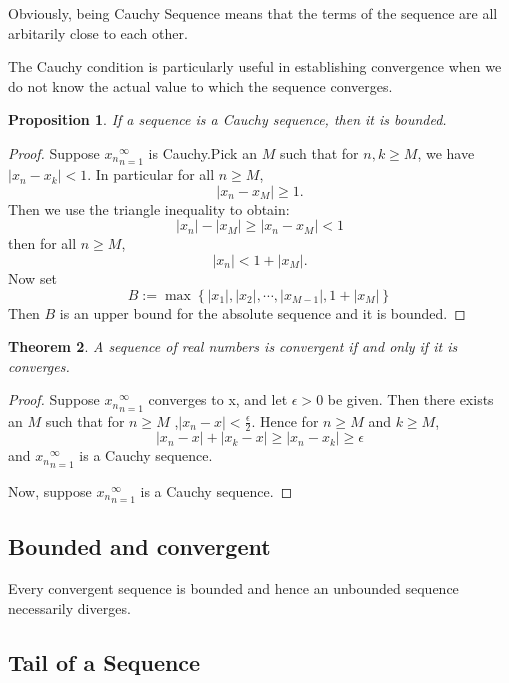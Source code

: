 \documentclass{article}
\newtheorem{theorem}{Theorem}[section]
\newtheorem{prop}[theorem]{Proposition}
\theoremstyle{definition}
\begin{document}
Obviously, being Cauchy Sequence means that the terms 
of the sequence are all arbitarily close to each other.

The Cauchy condition is particularly useful in establishing 
convergence when we do not know the actual value to which 
the sequence converges.

\begin{prop}
If a sequence is a Cauchy sequence, then it is bounded.
\end{prop}

\begin{proof}
    Suppose ${x_{n}}_{n=1}^{\infty}$ is Cauchy.Pick an $M$ 
    such that for $n,k\geq M$, we have $|x_{n}-x_{k}|<1$. In particular 
    for all $n\geq M$, $$|x_{n}-x_{M}|\geq 1.$$
    Then we use the triangle inequality to obtain:
    $$|x_{n}|-|x_{M}|\geq |x_{n}-x_{M}| <1$$
    then for all $n\geq M$, $$|x_{n}|<1+|x_{M}|.$$
    Now set 
    $$B:=\max\left\{|x_{1}|,|x_{2}|,\cdots,|x_{M-1}|,1+|x_{M}|\right\}$$
    Then $B$ is an upper bound for the absolute sequence and it is bounded.
\end{proof}

\begin{theorem}
    A sequence of real numbers is convergent if and only if it is converges.
\end{theorem}

\begin{proof}
Suppose ${x_{n}}_{n=1}^{\infty}$ converges to x, and let $\epsilon>0$ be given. Then there exists 
an $M$ such that for $n\geq M$ ,$|x_{n}-x|<\frac{\epsilon}{2}.$
Hence for $n\geq M$ and $k\geq M$, 
$$|x_{n}-x|+|x_{k}-x|\geq |x_{n}-x_{k}| \geq \epsilon$$
and ${x_{n}}_{n=1}^{\infty}$ is a Cauchy sequence.

Now, suppose ${x_{n}}_{n=1}^{\infty}$ is a Cauchy sequence.


\end{proof}






\subsection{Bounded and convergent}
Every convergent sequence is bounded and hence an unbounded sequence 
necessarily diverges.


\subsection{Tail of a Sequence}
\end{document}
